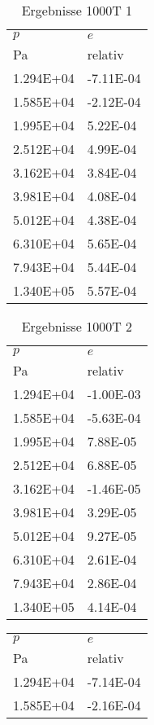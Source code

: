 \begin{table}\begin{tabular}{l l }
\toprule
$p$&$e$\\
 Pa & relativ \\\midrule
\num{1.294E+04}&\num{-7.11E-04}\\
\num{1.585E+04}&\num{-2.12E-04}\\
\num{1.995E+04}&\num{5.22E-04}\\
\num{2.512E+04}&\num{4.99E-04}\\
\num{3.162E+04}&\num{3.84E-04}\\
\num{3.981E+04}&\num{4.08E-04}\\
\num{5.012E+04}&\num{4.38E-04}\\
\num{6.310E+04}&\num{5.65E-04}\\
\num{7.943E+04}&\num{5.44E-04}\\
\num{1.340E+05}&\num{5.57E-04}\\
\bottomrule
\end{tabular}\caption{Ergebnisse 1000T 1}\end{table}\begin{table}\begin{tabular}{l l }
\toprule
$p$&$e$\\
 Pa & relativ \\\midrule
\num{1.294E+04}&\num{-1.00E-03}\\
\num{1.585E+04}&\num{-5.63E-04}\\
\num{1.995E+04}&\num{7.88E-05}\\
\num{2.512E+04}&\num{6.88E-05}\\
\num{3.162E+04}&\num{-1.46E-05}\\
\num{3.981E+04}&\num{3.29E-05}\\
\num{5.012E+04}&\num{9.27E-05}\\
\num{6.310E+04}&\num{2.61E-04}\\
\num{7.943E+04}&\num{2.86E-04}\\
\num{1.340E+05}&\num{4.14E-04}\\
\bottomrule
\end{tabular}\caption{Ergebnisse 1000T 2}\end{table}\begin{table}\begin{tabular}{l l }
\toprule
$p$&$e$\\
 Pa & relativ \\\midrule
\num{1.294E+04}&\num{-7.14E-04}\\
\num{1.585E+04}&\num{-2.16E-04}\\

\end{tabular}
\end{table}
